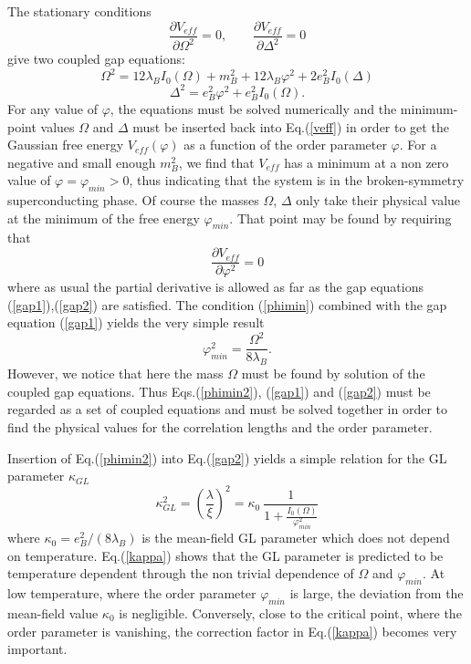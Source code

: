 \documentclass[aps,preprint]{revtex4}
\newcommand{\BE}{\begin{equation}}
\newcommand{\EE}{\end{equation}}
\begin{document}
The stationary conditions
\BE
\frac{\partial V_{eff}}{\partial\Omega^{2}}=0, \qquad
\frac{\partial V_{eff}}{\partial\Delta^{2}}=0
\EE
give two coupled gap equations:
\BE
{\Omega}^{2}=12 \lambda_{B}
I_{0}({\Omega})+m^{2}_{B}+12 \lambda_{B}\varphi^{2}+2
e^{2}_{B}I_{0}({\Delta})
\label{gap1}
\EE
\BE
{\Delta}^{2}=e^{2}_{B}\varphi^{2}+e^{2}_{B}I_{0}({\Omega}).
\label{gap2}
\EE
For any value of $\varphi$, the equations must be solved 
numerically and the minimum-point values $\Omega$
and $\Delta$ must be inserted back into Eq.(\ref{veff})
in order to get the Gaussian free energy 
$V_{eff}(\varphi)$
as a function of the order parameter 
$\varphi$.
For a negative and
small enough $m_B^2$, we find that $V_{eff}$ has a minimum at a 
non zero value of $\varphi=\varphi_{min}>0$, thus indicating that the
system is in the broken-symmetry superconducting phase.
Of course the masses $\Omega$, $\Delta$ only take their physical
value at the minimum of the free energy $\varphi_{min}$.
That point may be found by requiring that
\BE
\frac{\partial V_{eff}}{\partial\varphi^{2}}=0
\label{phimin}
\EE
where as usual the partial derivative is allowed as far as the
gap equations (\ref{gap1}),(\ref{gap2}) are satisfied\cite{stevenson}.
The condition (\ref{phimin}) combined with the gap equation (\ref{gap1})
yields the very simple result
\BE
\varphi_{min}^{2}=\frac{{\Omega^{2}}}{8\lambda_{B}}.
\label{phimin2}
\EE
However, we notice that here the mass $\Omega$ must be found
by solution of the coupled gap equations. Thus Eqs.(\ref{phimin2}),
(\ref{gap1}) and (\ref{gap2}) must be regarded as a set of
coupled equations and must be solved together in order to find
the physical values for the correlation lengths and the order
parameter.

Insertion of Eq.(\ref{phimin2}) into Eq.(\ref{gap2}) yields a
simple relation for the GL parameter $\kappa_{GL}$
\BE
\kappa_{GL}^{2} = \left( \frac{\lambda}{\xi}
\right)^{2}=\kappa_0 \>\frac{1}
{\displaystyle 1+\frac{I_{0}(\Omega)}{\varphi_{min}^{2}} }
\label{kappa}
\EE
where $\kappa_0=e_B^2/(8\lambda_B)$ is the mean-field GL parameter
which does not depend on temperature. Eq.(\ref{kappa}) shows that
the GL parameter is predicted to be temperature dependent
through the non trivial dependence of $\Omega$ and $\varphi_{min}$.
At low temperature, where the order parameter $\varphi_{min}$ is
large, the deviation from the mean-field value $\kappa_0$ is
negligible. Conversely, close to the critical point, where the
order parameter is vanishing, the correction factor in Eq.(\ref{kappa})
becomes very important\cite{gaussian,interpolation}.
\end{document}
